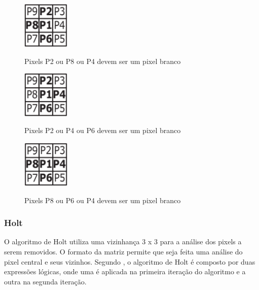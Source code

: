 \documentclass[12pt,oneside,a4paper,english,french,spanish,brazil,]{abntex2}
\begin{document}
\begin{figure}[ht]
\centering
\caption{Pixels P2 ou P8 ou P4 devem ser um pixel branco}
\includegraphics[width=0.2\textwidth]{imagens/PDI_Zhang_Suen_3.PNG}
\label{fig:PDI_Zhang_Suen_3}
\end{figure}

\begin{figure}[ht]
\centering
\caption{Pixels P2 ou P4 ou P6 devem ser um pixel branco}
\includegraphics[width=0.2\textwidth]{imagens/PDI_Zhang_Suen_4.PNG}
\label{fig:PDI_Zhang_Suen_4}
\end{figure}

\begin{figure}[ht]
\centering
\caption{Pixels P8 ou P6 ou P4 devem ser um pixel branco}
\includegraphics[width=0.2\textwidth]{imagens/PDI_Zhang_Suen_5.PNG}
\label{fig:PDI_Zhang_Suen_5}
\end{figure}

\subsubsection{Holt}

O algoritmo de Holt \cite{holt:1987} utiliza uma vizinhança 3 x 3 para a análise dos pixels a serem removidos. O formato da matriz permite que seja feita uma análise do pixel central e seus vizinhos. Segundo \citet{guilherme:2007}, o algoritmo de Holt é composto por duas expressões lógicas, onde uma é aplicada na primeira iteração do algoritmo e a outra na segunda iteração.
\end{document}
